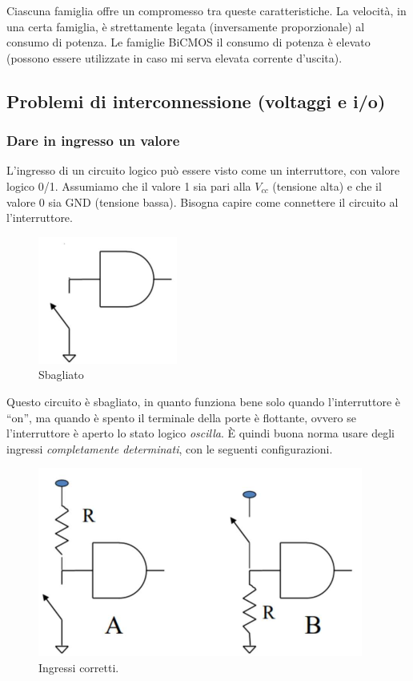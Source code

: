 \documentclass[
]{book}
\begin{document}
Ciascuna famiglia offre un compromesso tra queste caratteristiche. La
velocità, in una certa famiglia, è strettamente legata (inversamente
proporzionale) al consumo di potenza. Le famiglie BiCMOS il consumo di
potenza è elevato (possono essere utilizzate in caso mi serva elevata
corrente d'uscita).

\subsection{Problemi di interconnessione (voltaggi e
i/o)}\label{problemi-di-interconnessione-voltaggi-e-io}

\subsubsection{Dare in ingresso un
valore}\label{dare-in-ingresso-un-valore}

L'ingresso di un circuito logico può essere visto come un interruttore,
con valore logico 0/1. Assumiamo che il valore 1 sia pari alla
\(V_{cc}\) (tensione alta) e che il valore 0 sia GND (tensione bassa).
Bisogna capire come connettere il circuito al l'interruttore.

\begin{figure}
\centering
\includegraphics[width=0.2\linewidth,height=\textheight,keepaspectratio]{assets/imgs/ingresso_sbagliato.png}
\caption{Sbagliato}
\end{figure}

Questo circuito è sbagliato, in quanto funziona bene solo quando
l'interruttore è ``on'', ma quando è spento il terminale della porte è
flottante, ovvero se l'interruttore è aperto lo stato logico
\emph{oscilla}. È quindi buona norma usare degli ingressi
\emph{completamente determinati}, con le seguenti configurazioni.

\begin{figure}
\centering
\includegraphics[width=0.3\linewidth,height=\textheight,keepaspectratio]{assets/imgs/ingressi_corretti.png}
\caption{Ingressi corretti.}
\end{figure}
\end{document}
